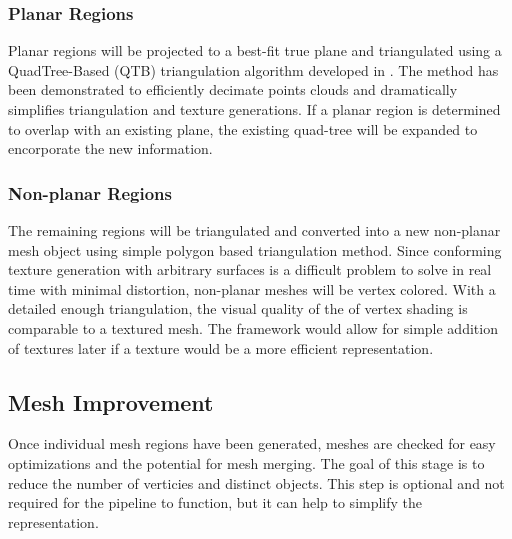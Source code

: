 \documentclass[english]{article}
\begin{document}
\subsubsection{Planar Regions}
Planar regions will be projected to a best-fit true plane and triangulated using a QuadTree-Based (QTB) triangulation algorithm developed in \cite{planesegmentationQTB}. The method has been demonstrated to efficiently decimate points clouds and dramatically simplifies triangulation and texture generations. If a planar region is determined to overlap with an existing plane, the existing quad-tree will be expanded to encorporate the new information.

\subsubsection{Non-planar Regions}
The remaining regions will be triangulated and converted into a new non-planar mesh object using simple polygon based triangulation method. Since conforming texture generation with arbitrary surfaces is a difficult problem to solve in real time with minimal distortion, non-planar meshes will be vertex colored. With a detailed enough triangulation, the visual quality of the of vertex shading is comparable to a textured mesh. The framework would allow for simple addition of textures later if a texture would be a more efficient representation.

\subsection{Mesh Improvement}
Once individual mesh regions have been generated, meshes are checked for easy optimizations and the potential for mesh merging. The goal of this stage is to reduce the number of verticies and distinct objects. This step is optional and not required for the pipeline to function, but it can help to simplify the representation. 




\end{document}
